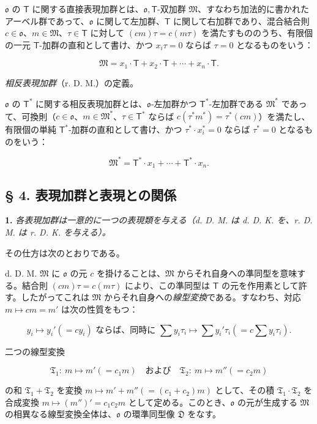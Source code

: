$\mathfrak{o}$ の $\mathsf T$ に関する直接表現加群とは、$\mathfrak{o},\mathsf T$-双加群 $\mathfrak M$、すなわち加法的に書かれたアーベル群であって、$\mathfrak{o}$ に関して左加群、$\mathsf T$ に関して右加群であり、混合結合則
$c\in\mathfrak{o}$、$m\in\mathfrak M$、$\tau\in\mathsf T$ に対して $(cm)\tau=c(m\tau)$
を満たすもののうち、有限個の一元 $\mathsf T$-加群の直和として書け、かつ $x_i\tau=0$ ならば $\tau=0$ となるものをいう：

\[
\mathfrak M=x_1\cdot\mathsf T+x_2\cdot\mathsf T+\cdots+x_n\cdot\mathsf T.
\]

\emph{相反表現加群}（r. D. M.）の定義。

$\mathfrak{o}$ の $\mathsf T^*$ に関する相反表現加群とは、$\mathfrak{o}$-左加群かつ $\mathsf T^*$-左加群である $\mathfrak M^*$ であって、可換則（$c\in\mathfrak{o}$、$m\in\mathfrak M^*$、$\tau\in\mathsf T^*$ ならば $c(\tau^*m^*)=\tau^*(cm)$）を満たし、有限個の単純 $\mathsf T^*$-加群の直和として書け、かつ $\tau^*\cdot x_i^*=0$ ならば $\tau^*=0$ となるものをいう：

\[
\mathfrak M^*=\mathsf T^*\cdot x_1+\cdots+\mathsf T^*\cdot x_n.
\]

\subsection*{§ 4. 表現加群と表現との関係}\label{der-zusammenhang-zwischen-darstellungsmoduln-und-darstellungen}

\textbf{1.} \emph{各表現加群は一意的に一つの表現類を与える（d. D. M. は d. D. K. を、r. D. M. は r. D. K. を与える）。}

その仕方は次のとおりである。

d. D. M. $\mathfrak M$ に $\mathfrak{o}$ の元 $c$ を掛けることは、$\mathfrak M$ からそれ自身への準同型を意味する。結合則 $(cm)\tau=c(m\tau)$ により、この準同型は $\mathsf T$ の元を作用素として許す。したがってこれは $\mathfrak M$ からそれ自身への\emph{線型変換}である。すなわち、対応 $m\mapsto cm=m'$ は次の性質をもつ：

\[
\text{$y_i\mapsto y_i'(=cy_i)$ ならば、同時に }
\sum y_i\tau_i\mapsto \sum y_i'\tau_i\left(=c\sum y_i\tau_i\right).
\]

二つの線型変換

\[
\mathfrak T_1:\ m\mapsto m'(=c_1m)
\quad\text{および}\quad
\mathfrak T_2:\ m\mapsto m''(=c_2m)
\]

の和 $\mathfrak T_1+\mathfrak T_2$ を変換 $m\mapsto m'+m''(=(c_1+c_2)m)$ として、その積 $\mathfrak T_1\cdot\mathfrak T_2$ を合成変換 $m\mapsto(m'')'=c_1c_2m$ として定める。このとき、$\mathfrak{o}$ の元が生成する $\mathfrak M$ の相異なる線型変換全体は、$\mathfrak{o}$ の環準同型像 $\overline{\mathfrak D}$ をなす。

